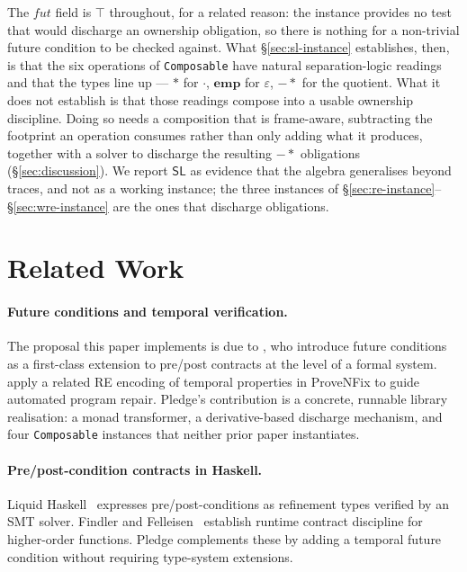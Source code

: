 \documentclass[acmsmall,screen]{acmart}
\newcommand{\SL}{\mathsf{SL}}
\newcommand{\sep}{*}
\newcommand{\wand}{-\!\!*}
\newcommand{\fut}{\mathit{fut}}
\begin{document}
The $\fut$ field is $\top$ throughout, for a related reason: the instance
provides no test that would discharge an ownership obligation, so there is
nothing for a non-trivial future condition to be checked against.
What \S\ref{sec:sl-instance} establishes, then, is that the six operations
of \lstinline{Composable} have natural separation-logic readings and that
the types line up --- $\sep$ for $\cdot$, $\mathbf{emp}$ for $\varepsilon$,
$\wand$ for the quotient.
What it does not establish is that those readings compose into a usable
ownership discipline.
Doing so needs a composition that is frame-aware, subtracting the footprint
an operation consumes rather than only adding what it produces, together
with a solver to discharge the resulting $\wand$ obligations
(\S\ref{sec:discussion}).
We report $\SL$ as evidence that the algebra generalises beyond traces, and
not as a working instance; the three instances of
\S\ref{sec:re-instance}--\S\ref{sec:wre-instance} are the ones that
discharge obligations.

\section{Related Work}
\label{sec:related}

\paragraph{Future conditions and temporal verification.}
The proposal this paper implements is due to \citet{song2025futurecond},
who introduce future conditions as a first-class extension to pre/post
contracts at the level of a formal system.
\citet{song2024provenfix} apply a related RE encoding of temporal
properties in ProveNFix to guide automated program repair.
Pledge's contribution is a concrete, runnable library realisation:
a monad transformer, a derivative-based discharge mechanism, and four
\lstinline{Composable} instances that neither prior paper instantiates.

\paragraph{Pre/post-condition contracts in Haskell.}
Liquid Haskell~\cite{vazou2014} expresses pre/post-conditions as refinement
types verified by an SMT solver.
Findler and Felleisen~\cite{findler2002} establish runtime contract discipline
for higher-order functions.
Pledge complements these by adding a temporal future condition without
requiring type-system extensions.
\end{document}
